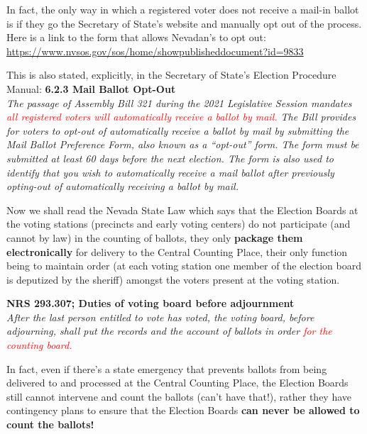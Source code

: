 \documentclass[preprint,13pt]{elsarticle}
\begin{document}
In fact, the only way in which a registered voter does not receive a mail-in ballot is if they go the Secretary of State's website and manually opt out of the process. Here is a link to the form that allows Nevadan's to opt out: \url{https://www.nvsos.gov/sos/home/showpublisheddocument?id=9833}

This is also stated, explicitly, in the Secretary of State's Election Procedure Manual: \textbf{6.2.3 Mail Ballot Opt-Out}\\
\textit{The passage of Assembly Bill 321 during the 2021 Legislative Session mandates \textcolor{red}{all registered voters will
automatically receive a ballot by mail.} The Bill provides for voters to opt-out of automatically receive a ballot
by mail by submitting the Mail Ballot Preference Form, also known as a “opt-out” form. The form must be
submitted at least 60 days before the next election. The form is also used to identify that you wish to
automatically receive a mail ballot after previously opting-out of automatically receiving a ballot by mail.}

Now we shall read the Nevada State Law which says that the Election Boards at the voting stations (precincts and early voting centers) do not participate (and cannot by law) in the counting of ballots, they only 
\textbf{package them electronically} for delivery to the Central Counting Place, their only function being to maintain order (at each voting station one member of the election board is deputized by the sheriff) amongst the voters present at the voting station.

\textbf{NRS 293.307; Duties of voting board before adjournment}\\
\textit{After the last person entitled to vote has voted, the voting board, before adjourning, shall put the records and the account of ballots in order \textcolor{red}{for the counting board.}}

In fact, even if there's a state emergency that prevents ballots from being delivered to and processed at the Central Counting Place, the Election Boards still cannot intervene and count the ballots (can't have that!), rather they have contingency plans to ensure that the Election Boards \textbf{can never be allowed to count the ballots!}
\end{document}
